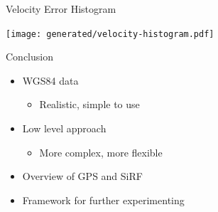 \documentclass[utf8,12pt]{beamer}
\begin{document}
\begin{frame}[plain]{Velocity Error Histogram}
\begin{center}
\centerline{\texttt{[image: generated/velocity-histogram.pdf]}}
\end{center}
\end{frame}

\begin{frame}{Conclusion}
    \begin{itemize}
        \item WGS84 data
        \begin{itemize}
            \item Realistic, simple to use
        \end{itemize}
        \item Low level approach
        \begin{itemize}
            \item More complex, more flexible
        \end{itemize}
        \item Overview of GPS and SiRF
        \item Framework for further experimenting
    \end{itemize}
\end{frame}

{
\begin{frame}
\end{frame}
}

\begin{frame}[plain]
\end{frame}

%
\end{document}
